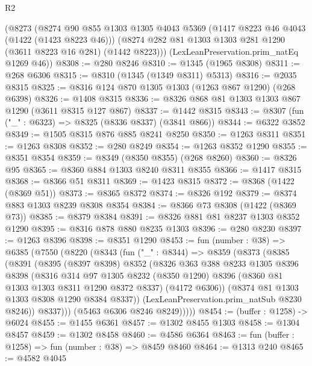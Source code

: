\begin{lexlean}{R2}
\begin{coremodule}
    (@8273
      (@8274
        @90
        @855
        @1303
        @1305
        @4043
        @5369
        (@1417 @8223 @46 @4043 (@1422 (@1423 @8223 @46)))
        (@8274 @282 @81 @1303 @1303 @281 @1290 (@3611 @8223 @16 @281) (@1442 @8223)))
      (LexLeanPreservation.prim_natEq @1269 @46))
@8308 := @280 @8246
@8310 := @1345 (@1965 @8308)
@8311 := @268 @6306
@8315 := @8310 (@1345 (@1349 @8311) @5313)
@8316 := @2035 @8315
@8325 := @8316 @124 @870 @1305 @1303 (@1263 @867 @1290) (@268 @6398)
@8326 := @1408 @8315
@8336 := @8326 @868 @81 @1303 @1303 @867 @1290 (@3611 @8315 @127 @867)
@8337 := @1442 @8315
@8343 := @8307 (fun ("_" : @6323) => @8325 (@8336 @8337) (@3841 @866))
@8344 := @6322 @3852
@8349 := @1505 @8315 @876 @885 @8241 @8250
@8350 := @1263 @8311
@8351 := @1263 @8308
@8352 := @280 @8249
@8354 := @1263 @8352 @1290
@8355 := @8351 @8354
@8359 := @8349 (@8350 @8355) (@268 @8260)
@8360 := @8326 @95
@8365 := @8360 @884 @1303 @8240 @8311 @8355
@8366 := @1417 @8315
@8368 := @8366 @51 @8311
@8369 := @1423 @8315
@8372 := @8368 (@1422 (@8369 @51))
@8373 := @8365 @8372
@8374 := @8326 @192
@8379 := @8374 @883 @1303 @8239 @8308 @8354
@8384 := @8366 @73 @8308 (@1422 (@8369 @73))
@8385 := @8379 @8384
@8391 := @8326 @881 @81 @8237 @1303 @8352 @1290
@8395 := @8316 @878 @880 @8235 @1303
@8396 := @280 @8230
@8397 := @1263 @8396
@8398 := @8351 @1290
@8453 := fun (number : @38) =>
  @6385
    (@7550
      (@8220
        (@8343
          (fun ("_" : @8344) =>
          @8359
            (@8373
              (@8385
                (@8391
                  (@8395
                    (@8397 @8398)
                    @8352
                    (@8326
                      @363
                      @388
                      @8233
                      @1305
                      @8396
                      @8398
                      (@8316
                        @314
                        @97
                        @1305
                        @8232
                        (@8350 @1290)
                        @8396
                        (@8360 @81 @1303 @1303 @8311 @1290 @8372 @8337)
                        (@4172 @6306))
                      (@8374 @81 @1303 @1303 @8308 @1290 @8384 @8337))
                    (LexLeanPreservation.prim_natSub @8230 @8246))
                  @8337)))
            (@5463 @6306 @8246 @8249)))))
@8454 := (buffer : @1258) -> @6024
@8455 := @1455 @6361
@8457 := @1302 @8455 @1303
@8458 := @1304 @8457
@8459 := @1302 @8458
@8460 := @4586 @6364
@8463 := fun (buffer : @1258) => fun (number : @38) => @8459 @8460
@8464 := @1313 @240
@8465 := @4582 @4045

\end{coremodule}
\end{lexlean}
